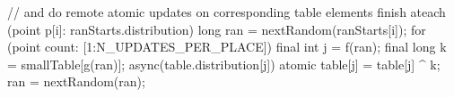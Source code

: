 
  // and do remote atomic updates on corresponding table elements
    finish ateach (point p[i]: ranStarts.distribution) {
      long ran = nextRandom(ranStarts[i]);
      for (point count: [1:N_UPDATES_PER_PLACE]) {
        final int  j = f(ran);
        final long k = smallTable[g(ran)];
        async(table.distribution[j])
          atomic {
            table[j] = table[j] ^ k;
          }
        ran = nextRandom(ran);
      }
    }